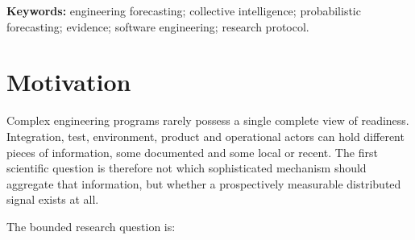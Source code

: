 \begin{abstract}
Engineering decisions often depend on information distributed across technical and operational actors and only partly represented in structured project data. This protocol asks whether that distributed knowledge can become auditable probabilistic evidence \emph{beyond what the organization already knows}, without perturbing the engineering process being observed. Study~0 applies a minimum-sufficient-mechanism principle. Study~0A is a dry funnel that tests whether real engineering events can be prospectively converted into important, uncertain, objectively resolvable and confidentiality-safe Forecast Contracts. Study~0B, only if warranted, uses private probability elicitation: the accountable owner's private probability and official status, independent participant forecasts plus meta-predictions, and---where a defensible historical reference class exists---a base-rate forecast are frozen at the same information time. No collective aggregate is exposed before resolution. The primary comparison is the paired Brier-loss difference between a prospectively fixed private collective aggregator and the owner's forecast; base-rate skill is a required secondary reference only for contracts with a defensible historical reference class, and dependence is handled at the operational-cluster level. Prediction markets are deferred to a later intervention-aware study. Design simulations characterize the continuation rule as a screening/non-inferiority gate rather than a superiority test. No empirical forecasting-benefit or operational-value claim is made at protocol stage.
\end{abstract}

\noindent\textbf{Keywords:} engineering forecasting; collective intelligence; probabilistic forecasting; evidence; software engineering; research protocol.

\section{Motivation}
Complex engineering programs rarely possess a single complete view of readiness. Integration, test, environment, product and operational actors can hold different pieces of information, some documented and some local or recent. The first scientific question is therefore not which sophisticated mechanism should aggregate that information, but whether a prospectively measurable distributed signal exists at all.

The bounded research question is:


